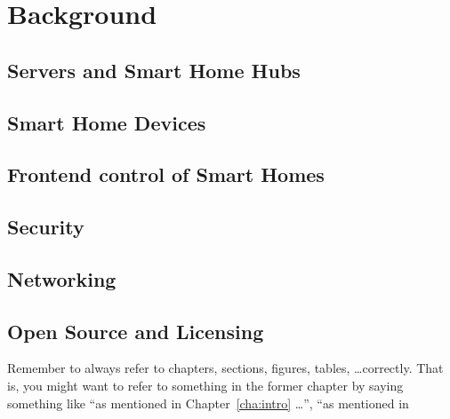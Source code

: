 \chapter{Background} \label{cha:chapter2}

\section{Servers and Smart Home Hubs} \label{sec:chap2:servers}
\section{Smart Home Devices} \label{sec:chap2:devices}
\section{Frontend control of Smart Homes} \label{sec:chap2:frontend}
\section{Security} \label{sec:chap2:security}
\section{Networking} \label{sec:chap2:networking}
\section{Open Source and Licensing} \label{sec:chap2:opensource}
 

Remember to always refer to chapters, sections, figures, tables,
\ldots correctly. That is, you might want to refer to something in the
former chapter by saying something like ``as mentioned in
Chapter~\ref{cha:intro} \ldots'', ``as mentioned in
